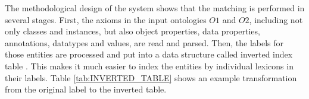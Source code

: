 The methodological design of the system shows that the matching is performed in several stages. First, the axioms in the input ontologies $O1$ and $O2$, including not only classes and instances, but also object properties, data properties, annotations, datatypes and values, are read and parsed. Then, the labels for those entities are processed and put into a data structure called inverted index table \cite{DBLP:conf/semweb/Jimenez-RuizG11}. This makes it much easier to index the entities by individual lexicons in their labels. Table \ref{tab:INVERTED_TABLE} shows an example transformation from the original label to the inverted table.

\begin{table}[ht]
\centering
{}
\caption{Inverted Index Table}
\label{tab:INVERTED_TABLE}
\end{table}

